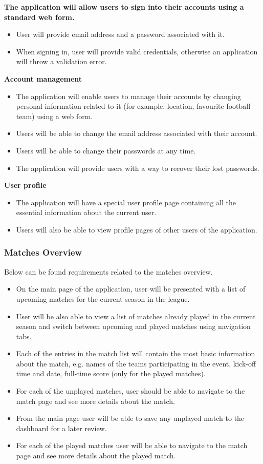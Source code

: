 \textbf{The application will allow users to sign into their accounts using a standard web form.}
\begin{itemize}
	\item User will provide email address and a password associated with it.
	\item When signing in, user will provide valid credentials, otherwise an application will throw a validation error.
\end{itemize}

\textbf{Account management}
\begin{itemize}
	\item The application will enable users to manage their accounts by changing personal information related to it (for example, location, favourite football team) using a web form.
	\item Users will be able to change the email address associated with their account.
	\item Users will be able to change their passwords at any time.  
	\item The application will provide users with a way to recover their lost passwords.
\end{itemize}

\textbf{User profile}
\begin{itemize}
	\item The application will have a special user profile page containing all the essential information about the current user.
	\item Users will also be able to view profile pages of other users of the application.
\end{itemize}

\subsubsection{Matches Overview}
\label{subsubsec:matchesoverview_req}
Below can be found requirements related to the matches overview.
\begin{itemize}
	\item On the main page of the application, user will be presented with a list of upcoming matches for the current season in the league.
    \item User will be also able to view a list of matches already played in the current season and switch between upcoming and played matches using navigation tabs.
   \item Each of the entries in the match list will contain the most basic information about the match, e.g. names of the teams participating in the event, kick-off time and date, full-time score (only for the played matches).
   \item For each of the unplayed matches, user should be able to navigate to the match page and see more details about the match.
  	\item From the main page user will be able to save any unplayed match to the dashboard for a later review.
  	\item For each of the played matches user will be able to navigate to the match page and see more details about the played match.
\end{itemize}

